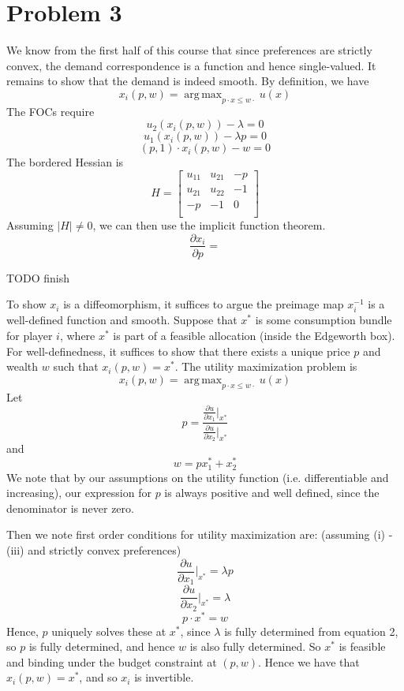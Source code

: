 \documentclass[10pt,letter]{article}
\DeclareMathOperator*{\argmax}{arg\,max}
\begin{document}
\section*{Problem 3}
We know from the first half of this course that since preferences are strictly convex, the demand correspondence is a function and hence single-valued. It remains to show that the demand is indeed smooth.
By definition, we have
\[ x_i(p,w) = \argmax_{p\cdot x \le w \cdot } u(x) \]
The FOCs require
\[ u_2(x_i(p,w)) - \lambda = 0 \]
\[ u_1(x_i(p,w)) - \lambda p = 0 \]
\[ (p,1) \cdot x_i(p,w) - w  = 0\]
The bordered Hessian is
\[ H = \begin{bmatrix} u_{11} & u_{21} & -p \\ u_{21} & u_{22} & -1 \\ -p & -1 & 0 \\ \end{bmatrix}\]
Assuming $|H| \neq 0$, we can then use the implicit function theorem.
\[ \frac{\partial x_i}{\partial p} =  \]

TODO finish


To show $x_i$ is a diffeomorphism, it suffices to argue the preimage map $x_i^{-1}$ is a well-defined function and smooth. Suppose that $x^*$ is some consumption bundle for player $i$, where $x^*$ is part of a feasible allocation (inside the Edgeworth box). For well-definedness, it suffices to show that there exists a unique price $p$ and wealth $w$ such that $x_i(p,w) = x^*$. The utility maximization problem is
\[ x_i(p,w) = \argmax_{p\cdot x \le w \cdot } u(x) \]
Let
\[ p = \frac{\frac{\partial u}{\partial x_1} \Bigr|_{ x^*}}{\frac{\partial u}{\partial x_2} \Bigr|_{x^*}} \]
and
\[ w = p x^*_1 + x^*_2  \]
We note that by our assumptions on the utility function (i.e. differentiable and increasing), our expression for $p$ is always positive and well defined, since the denominator is never zero.

Then we note first order conditions for utility maximization are: (assuming (i) - (iii) and strictly convex preferences)
\[ \frac{\partial u}{\partial x_1} \Bigr|_{x^*} = \lambda p \]
\[ \frac{\partial u}{\partial x_2} \Bigr|_{x^*} = \lambda  \]
\[ p \cdot x^* = w  \]
Hence, $p$ uniquely solves these at $x^*$, since $\lambda$ is fully determined from equation 2, so $p$ is fully determined, and hence $w$ is also fully determined. So $x^*$ is feasible and binding under the budget constraint at $(p,w)$. Hence we have that
$x_i(p,w) = x^*$, and so $x_i$ is invertible.
\end{document}
